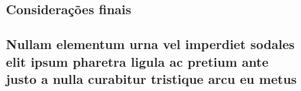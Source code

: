 \documentclass[
article,			%
11pt,				%
oneside,			%
a4paper,			%
english,			%
brazil,				%
sumario=tradicional,
]{abntex2}
\begin{document}
	\section{Considerações finais}
	
	\lipsum[1]
	
	\begin{citacao}
		\lipsum[2]
	\end{citacao}
	
	\lipsum[3]
	
	\postextual
	
	
	
	
	
	\begin{apendicesenv}
		
		\chapter{Nullam elementum urna vel imperdiet sodales elit ipsum pharetra ligula
			ac pretium ante justo
		 a nulla curabitur tristique arcu eu metus}
		\lipsum[55-56]
		
	\end{apendicesenv}
	
\end{document}
